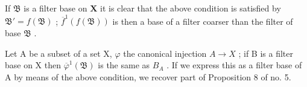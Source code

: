 If \(\mathfrak{B}\) is a filter base on \(\mathbf{X}\) it is clear that the above condition is satisfied by \(\mathfrak{B}' = f(\mathfrak{B})\) ; \(\overline{f}^1 (f(\mathfrak{B}))\) is then a base of a filter coarser than the filter of base \(\mathfrak{B}\) .

Let A be a subset of a set X, \(\varphi\) the canonical injection \(A \rightarrow X\) ; if B is a filter base on X then \(\overline{\varphi}^{1}(\mathfrak{B})\) is the same as \(B_{A}\) . If we express this as a filter base of A by means of the above condition, we recover part of Proposition 8 of no. 5.

